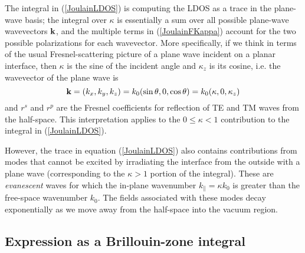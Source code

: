 \documentclass[letterpaper]{article}
\begin{document}
The integral in (\ref{JoulainLDOS}) is computing the LDOS as a trace in 
the plane-wave basis; the integral over $\kappa$ is essentially a sum over 
all possible plane-wave wavevectors $\mathbf{k}$, and the multiple terms in 
(\ref{JoulainFKappa}) account for the two possible polarizations for each 
wavevector. More specifically, if we think in terms of the usual 
Fresnel-scattering picture of a plane wave incident on a planar interface, 
then $\kappa$ is the sine of the incident angle and $\kappa_z$ is its 
cosine, i.e. the wavevector of the plane wave 
is %
$$ \mathbf{k} = (k_x, k_y, k_z) = k_0(\sin\theta, 0, \cos\theta)
   =k_0(\kappa, 0, \kappa_z)
$$
and $r^s$ and $r^p$ are the Fresnel coefficients for reflection
of TE and TM waves from the half-space. 
This interpretation applies to the $0\le \kappa<1$ contribution to 
the integral in (\ref{JoulainLDOS}). 

However, the trace in equation (\ref{JoulainLDOS}) also contains
contributions from modes that cannot be excited by irradiating
the interface from the outside with a plane wave (corresponding
to the $\kappa>1$ portion of the integral). These are 
\textit{evanescent} waves for which the in-plane wavenumber
$k_\parallel=\kappa k_0$ is greater than the free-space wavenumber 
$k_0$. The fields associated with these modes decay exponentially
as we move away from the half-space into the vacuum region. 

\subsection*{Expression as a Brillouin-zone integral}
\end{document}
